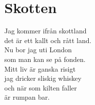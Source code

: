 \section{Skotten}
Jag kommer ifrån skottland\\
det är ett kallt och rått land.\\
Nu bor jag uti London\\
som man kan se på fonden.\\

Mitt liv är ganska risigt\\
jag dricker sliskig whiskey\\
och när som kilten faller\\
är rumpan bar.\\